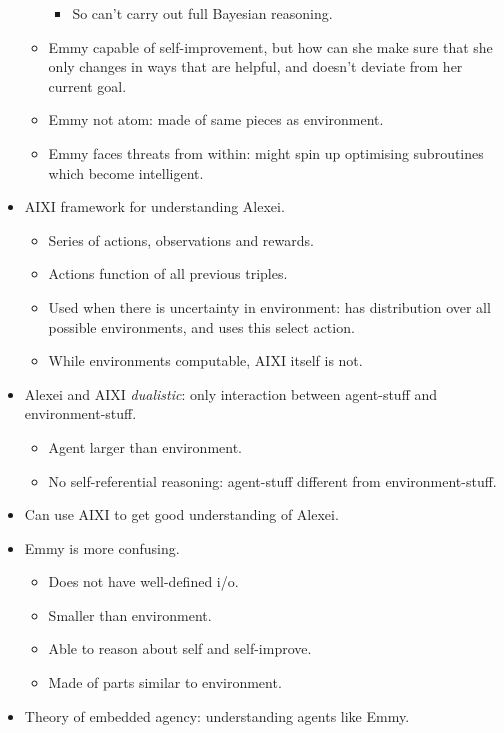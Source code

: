\begin{itemize}
\begin{itemize}
\begin{itemize}
            \item So can't carry out full Bayesian reasoning.
        \end{itemize}
        \item Emmy capable of self-improvement, but how can she make sure that she only changes in ways that are helpful, and doesn't deviate from her current goal.
        \item Emmy not atom: made of same pieces as environment.
        \item Emmy faces threats from within: might spin up optimising subroutines which become intelligent.
    \end{itemize}
    \item AIXI framework for understanding Alexei.
    \begin{itemize}
        \item Series of actions, observations and rewards.
        \item Actions function of all previous triples.
        \item Used when there is uncertainty in environment: has distribution over all possible environments, and uses this select action.
        \item While environments computable, AIXI itself is not.
    \end{itemize}
    \item Alexei and AIXI \emph{dualistic}: only interaction between agent-stuff and environment-stuff.
    \begin{itemize}
        \item Agent larger than environment.
        \item No self-referential reasoning: agent-stuff different from environment-stuff.
    \end{itemize}
    \item Can use AIXI to get good understanding of Alexei.
    \item Emmy is more confusing.
    \begin{itemize}
        \item Does not have well-defined i/o.
        \item Smaller than environment.
        \item Able to reason about self and self-improve.
        \item Made of parts similar to environment.
    \end{itemize}
    \item Theory of embedded agency: understanding agents like Emmy.

\end{itemize}
